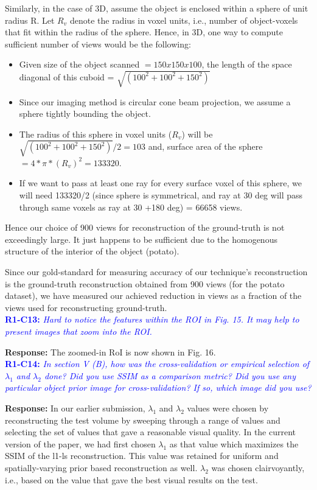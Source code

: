 \documentclass{article}
\begin{document}
Similarly, in the case of 3D, assume the object is enclosed within a sphere of unit radius R. Let $R_v$ denote the radius in voxel units, i.e., number of object-voxels that fit within the radius of the sphere. Hence, in 3D, one way to compute sufficient number of views would be the following:
\begin{itemize}
\item Given size of the object scanned $= 150 x 150 x 100$, the length of the space diagonal of this cuboid = $\sqrt{(100^2 + 100^2 + 150^2)}$
\item Since our imaging method is circular cone beam projection, we assume a sphere tightly bounding the object.
\item The radius of this sphere in voxel units ($R_v$) will be $\sqrt{(100^2 + 100^2 + 150^2)}/2 = 103$
and, surface area of the sphere $= 4*\pi*(R_v)^2 = 133320$.
\item If we want to pass at least one ray for every surface voxel of this sphere, we will need 133320/2 (since sphere is symmetrical, and ray at 30 deg will pass through same voxels as ray at 30 +180 deg) = 66658 views. 
\end{itemize}
Hence our choice of 900 views for reconstruction of the ground-truth is not exceedingly large. It just happens to be sufficient due to the homogenous structure of the interior of the object (potato).

Since our gold-standard for measuring accuracy of our technique's reconstruction is the ground-truth reconstruction obtained from 900 views (for the potato dataset), we have measured our achieved reduction in views as a fraction of the views used for reconstructing ground-truth. \\

\textcolor{blue}{\textbf{R1-C13:}\textit{ Hard to notice the features within the ROI in Fig. 15. It may help to present images that zoom into the ROI.}}
    
\textbf{Response:} The zoomed-in RoI is now shown in Fig. 16. \\

\textcolor{blue}{\textbf{R1-C14:}\textit{ In section V (B), how was the cross-validation or empirical selection of $\lambda_1$ and $\lambda_2$ done? Did you use SSIM as a comparison metric? Did you use any particular object prior image for cross-validation? If so, which image did you use? }}

\textbf{Response:} In our earlier submission, $\lambda_1$ and $\lambda_2$ values were chosen by reconstructing the test volume by sweeping through a range of values and selecting the set of values that gave a reasonable visual quality. In the current version of the paper, we had first chosen $\lambda_1$ as that value which maximizes the SSIM of the l1-ls reconstruction. This value was retained for uniform and spatially-varying prior based reconstruction as well. $\lambda_2$ was chosen clairvoyantly,  i.e., based on the value that gave the best visual results on the test.\\
\end{document}
